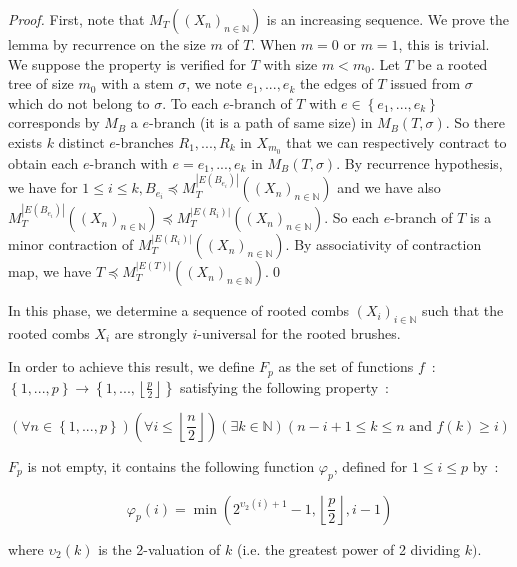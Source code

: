 \documentclass{llncs}
\begin{document}
\begin{proof} First, note that $M_T \left( {\left( {X_n } \right)_{n \in \mathbb{N}} } \right)$
is an increasing sequence. We prove the lemma by recurrence on the
size $m$ of $T$. When $m = 0$ or $m = 1$, this is trivial. We
suppose the property is verified for $T$ with size $m < m_0 $. Let
$T$ be a rooted tree of size $m_0 $ with a stem $\sigma $, we note
$e_1 ,...,e_k $ the edges of $T$ issued from $\sigma $ which do
not belong to $\sigma $. To each $e$-branch of $T$ with $e \in
\left\{ {e_1 ,...,e_k } \right\}$ corresponds by $M_B $ a
$e$-branch (it is a path of same size) in $M_B \left( {T,\sigma }
\right)$. So there exists $k$ distinct $e$-branches $R_1 ,...,R_k
$ in $X_{m_0 } $ that we can respectively contract to obtain each
$e$-branch with $e = e_1 ,...,e_k $ in $M_B \left( {T,\sigma }
\right)$. By recurrence hypothesis, we have for $1 \le i \le k,
B_{e_i } \preceq M_T^{\left| {E\left( {B_{e_i } } \right)}
\right|} \left( {\left( {X_n } \right)_{n \in \mathbb{N}} }
\right)$ and we have also $M_T^{\left| {E\left( {B_{e_i } }
\right)} \right|} \left( {\left( {X_n } \right)_{n \in \mathbb{N}}
} \right)\preceq M_T^{\left| {E\left( {R_i } \right)} \right|}
\left( {\left( {X_n } \right)_{n \in \mathbb{N}} } \right)$. So
each $e$-branch of $T$ is a minor contraction of $M_T^{\left|
{E\left( {R_i } \right)} \right|} \left( {\left( {X_n } \right)_{n
\in \mathbb{N}} } \right)$. By associativity of contraction map,
we have $T\preceq M_T^{\left| {E\left( T \right)} \right|} \left(
{\left( {X_n } \right)_{n \in \mathbb{N}} } \right)$.\qed
\end{proof}




In this phase, we determine a sequence of rooted combs $\left(
{X_i } \right)_{i \in \mathbb{N}} $ such that the rooted combs
$X_i $ are strongly $i$-universal for the rooted brushes.

In order to achieve this result, we define $F_p $ as the set of
functions $f$~: $\left\{ {1,...,p} \right\} \to \left\{
{1,...,\left\lfloor {\frac{p}{2}} \right\rfloor } \right\}$
satisfying the following property~:


\[
\left( {\forall n \in \left\{ {1,...,p} \right\}} \right)\left(
{\forall i \le \left\lfloor {\frac{n}{2}} \right\rfloor }
\right)\left( {\exists k \in \mathbb{N}} \right)\left( {n - i + 1
\le k \le n\mbox{ and }f(k) \ge i} \right)
\]





\begin{lemma} $F_p $ is not empty, it contains the following function
$\varphi _p $, defined for $1 \le i \le p$ by~:


\[
\varphi _p \left( i \right) = \min \left( {2^{\upsilon _2 \left( i \right) +
1} - 1,\left\lfloor {\frac{p}{2}} \right\rfloor ,i - 1} \right)
\]



\noindent
where $\upsilon _2 \left( k \right)$ is the 2-valuation of $k$ (i.e. the
greatest power of 2 dividing $k)$.
\end{lemma}
\end{document}
